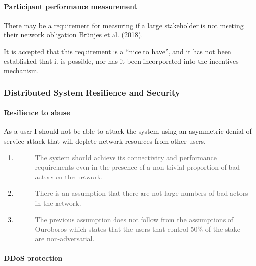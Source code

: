 \documentclass[11pt,a4paper]{article}
\begin{document}
\paragraph{Participant performance measurement}

There may be a requirement for measuring if a large stakeholder is not
meeting their network obligation Br\"unjes et al. (2018).

It is accepted that this requirement is a ``nice to have'', and it has
not been established that it is possible, nor has it been incorporated
into the incentives mechanism.

\subsubsection{Distributed System Resilience and Security}
\label{distributed-system-resilience-and-security}

\paragraph{Resilience to abuse}

As a user I should not be able to attack the system using an asymmetric
denial of service attack that will deplete network resources from other
users.

\begin{enumerate}
\def\labelenumi{\arabic{enumi}.}
\item
  \begin{quote}
  The system should achieve its connectivity and performance
  requirements even in the presence of a non-trivial proportion of bad
  actors on the network.
  \end{quote}
\item
  \begin{quote}
  There is an assumption that there are not large numbers of bad actors
  in the network.
  \end{quote}
\item
  \begin{quote}
  The previous assumption does not follow from the assumptions of
  Ouroboros which states that the users that control 50\% of the stake
  are non-adversarial.
  \end{quote}
\end{enumerate}

\paragraph{DDoS protection}
\end{document}
